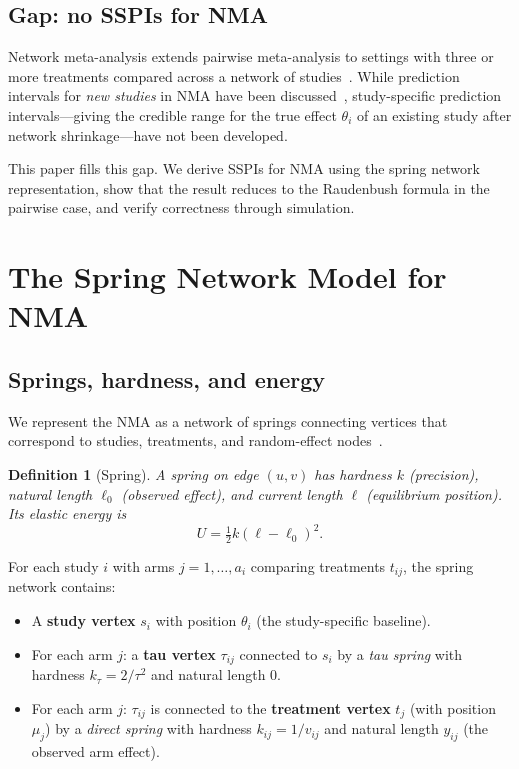 \documentclass[12pt]{article}
\newtheorem{definition}{Definition}
\begin{document}
\subsection{Gap: no SSPIs for NMA}

Network meta-analysis extends pairwise meta-analysis to settings with
three or more treatments compared across a network of
studies~\citep{Salanti2012}.  While prediction intervals for
\emph{new studies} in NMA have been
discussed~\citep{Riley2011,Guddat2012}, study-specific prediction
intervals---giving the credible range for the true effect $\theta_i$ of
an existing study after network shrinkage---have not been developed.

This paper fills this gap.  We derive SSPIs for NMA using the spring
network representation, show that the result reduces to the Raudenbush
formula in the pairwise case, and verify correctness through simulation.


\section{The Spring Network Model for NMA}

\subsection{Springs, hardness, and energy}

We represent the NMA as a network of springs connecting vertices
that correspond to studies, treatments, and random-effect
nodes~\citep{Papakonstantinou2024}.

\begin{definition}[Spring]
A spring on edge $(u,v)$ has \emph{hardness} $k$ (precision),
\emph{natural length} $\ell_0$ (observed effect), and \emph{current
length} $\ell$ (equilibrium position).  Its elastic energy is
\begin{equation}
  U = \tfrac{1}{2} k (\ell - \ell_0)^2.
\end{equation}
\end{definition}

For each study $i$ with arms $j = 1, \ldots, a_i$ comparing treatments
$t_{ij}$, the spring network contains:
\begin{itemize}
  \item A \textbf{study vertex} $s_i$ with position $\theta_i$
    (the study-specific baseline).
  \item For each arm $j$: a \textbf{tau vertex} $\tau_{ij}$ connected to
    $s_i$ by a \emph{tau spring} with hardness $k_\tau = 2/\tau^2$ and
    natural length $0$.
  \item For each arm $j$: $\tau_{ij}$ is connected to the
    \textbf{treatment vertex} $t_j$ (with position $\mu_j$) by a
    \emph{direct spring} with hardness $k_{ij} = 1/v_{ij}$ and natural
    length $y_{ij}$ (the observed arm effect).
\end{itemize}
\end{document}
